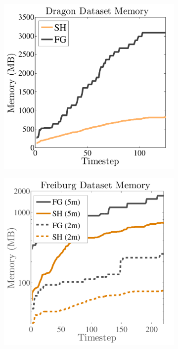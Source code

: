 \documentclass[10pt,twocolumn,letterpaper]{article}
\begin{document}
\begin{figure}
  \centering
    \begin{minipage}{0.25\linewidth}
	 \begin{subfigure}{1.0\linewidth} \centering
			\includegraphics[width=1.0\textwidth]{img/memoryusage.pdf}
			 \caption{} 
			 \label{fig:memory_data}
		 \end{subfigure}  
		  \begin{subfigure}{1.0\linewidth} \centering
			\includegraphics[width=1.0\textwidth]{img/memoryusage2.pdf}

\end{subfigure}
\end{minipage}
\end{figure}
\end{document}
